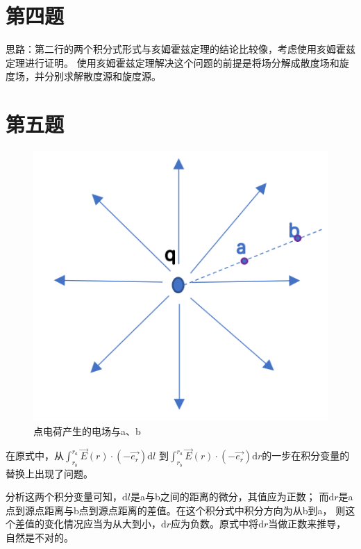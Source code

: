 \documentclass[a4paper]{article}
\begin{document}
	\section{第四题}
		思路：第二行的两个积分式形式与亥姆霍兹定理的结论比较像，考虑使用亥姆霍兹定理进行证明。
		使用亥姆霍兹定理解决这个问题的前提是将场分解成散度场和旋度场，并分别求解散度源和旋度源。

	\section{第五题}
		\begin{figure}[htbp]
			\centering
			\includegraphics[scale=0.7]{5.png}
			\caption{点电荷产生的电场与a、b}
		\end{figure}
		在原式中，从$\int _{r_b} ^{r_a} \vec{E}(r)\cdot(-\vec{e_r}) \mathrm{d}l$
		到$\int _{r_b} ^{r_a} \vec{E}(r)\cdot(-\vec{e_r}) \mathrm{d}r$的一步在积分变量的替换上出现了问题。

		分析这两个积分变量可知，$\mathrm{d}l$是a与b之间的距离的微分，其值应为正数；
		而$\mathrm{d}r$是a点到源点距离与b点到源点距离的差值。在这个积分式中积分方向为从b到a，
		则这个差值的变化情况应当为从大到小，$\mathrm{d}r$应为负数。原式中将$\mathrm{d}r$当做正数来推导，自然是不对的。
\end{document}
